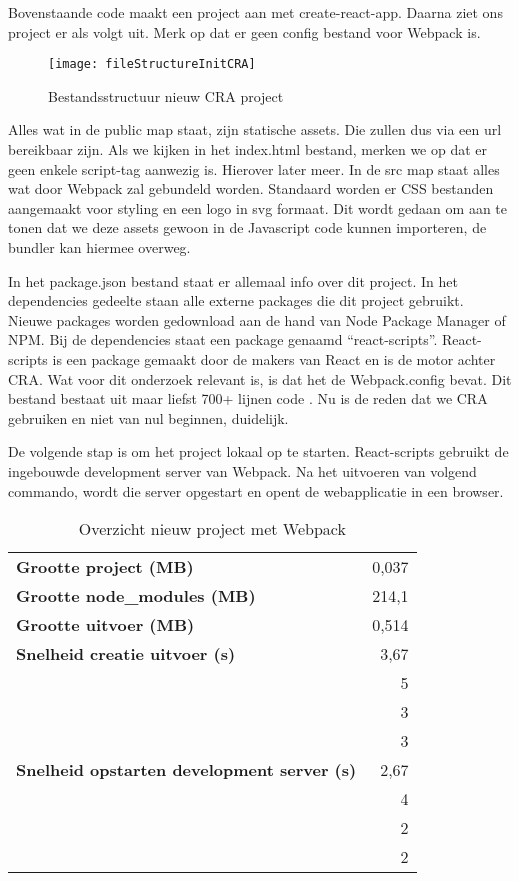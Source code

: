 

Bovenstaande code maakt een project aan met create-react-app. Daarna ziet ons project er als volgt uit. Merk op dat er geen config bestand voor Webpack is.

\begin{figure}[h]
\texttt{[image: fileStructureInitCRA]}
    \centering
    \caption{Bestandsstructuur nieuw CRA project}
\end{figure}

Alles wat in de public map staat, zijn statische assets. Die zullen dus via een url bereikbaar zijn. Als we kijken in het index.html bestand, merken we op dat er geen enkele script-tag aanwezig is. Hierover later meer.
In de src map staat alles wat door Webpack zal gebundeld worden. Standaard worden er CSS bestanden aangemaakt voor styling en een logo in svg formaat. Dit wordt gedaan om aan te tonen dat we deze assets gewoon in de Javascript code kunnen importeren, de bundler kan hiermee overweg. 



In het package.json bestand staat er allemaal info over dit project. In het dependencies gedeelte staan alle externe packages die dit project gebruikt. Nieuwe packages worden gedownload aan de hand van Node Package Manager of NPM. Bij de dependencies staat een package genaamd “react-scripts”. 
React-scripts \autocite{facebook-2018} is een package gemaakt door de makers van React en is de motor achter CRA. 
Wat voor dit onderzoek relevant is, is dat het de Webpack.config bevat. Dit bestand bestaat uit maar liefst 700+ lijnen code \autocite{facebook-2021}. Nu is de reden dat we CRA gebruiken en niet van nul beginnen, duidelijk. 

De volgende stap is om het project lokaal op te starten. React-scripts gebruikt de ingebouwde development server van Webpack. Na het uitvoeren van volgend commando, wordt die server opgestart en opent de webapplicatie in een browser.



\begin{table}[h]
    \centering
    \begin{tabular}{lr}
    \textbf{Grootte project (MB)} & 0,037 \\
    \textbf{Grootte node\_modules (MB)} & 214,1 \\
    \textbf{Grootte uitvoer (MB)} & 0,514 \\
    \textbf{Snelheid creatie uitvoer (s)} & 3,67 \\
    \textbf{} & 5 \\
    \textbf{} & 3 \\
    \textbf{} & 3 \\
    \textbf{Snelheid opstarten development server (s)} & 2,67 \\
    \textbf{} & 4 \\
    \textbf{} & 2 \\
    \textbf{} & 2
    \end{tabular}
    \caption{Overzicht nieuw project met Webpack}
    \end{table}

